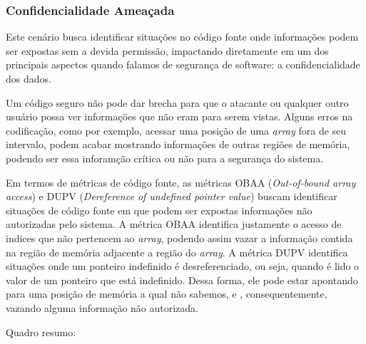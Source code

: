 \subsubsection{Confidencialidade Ameaçada}

Este cenário busca identificar situações no código fonte onde informações podem ser expostas sem a devida permissão, impactando diretamente em um dos principais aspectos quando falamos de segurança de software: a confidencialidade dos dados.

Um código seguro não pode dar brecha para que o atacante ou qualquer outro usuário possa ver informações que não eram para serem vistas. Alguns erros na codificação, como por exemplo, acessar uma posição de uma \emph{array} fora de seu intervalo, podem acabar mostrando informações de outras regiões de memória, podendo ser essa inforamção crítica ou não para a segurança do sistema.

Em termos de métricas de código fonte, as métricas OBAA (\emph{Out-of-bound array access}) e DUPV (\emph{Dereference of undefined pointer value}) buscam identificar situações de código fonte em que podem ser expostas informações não autorizadas pelo sistema. A métrica OBAA identifica justamente o acesso de indices que não pertencem ao \emph{array}, podendo assim vazar a informação contida na região de memória adjacente a região do \emph{array}. A métrica DUPV identifica situações onde um ponteiro indefinido é desreferenciado, ou seja, quando é lido o valor de um ponteiro que está indefinido. Dessa forma, ele pode estar apontando para uma posição de memória a qual não sabemos, e , consequentemente, vazando alguma informação não autorizada. 

Quadro resumo:

